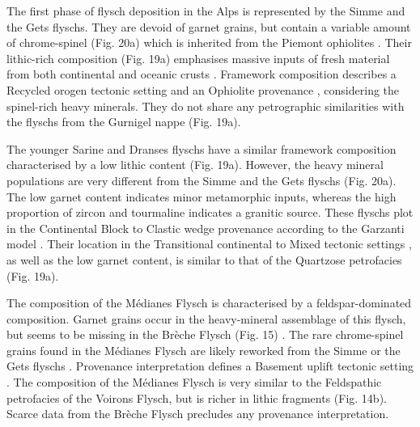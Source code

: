 \documentclass[twoside]{article}
\begin{document}
The first phase of flysch deposition in the Alps is represented by the Simme and the Gets flyschs. They are devoid of garnet grains, but contain a variable amount of chrome-spinel (Fig. 20a) which is inherited from the Piemont ophiolites \citep{Bertrand1976,Bill1997,Beltran-Trivino2013}. Their lithic-rich composition (Fig. 19a) emphasises massive inputs of fresh material from both continental and oceanic crusts \citep[and references therein]{Gasinski1997}. Framework composition describes a Recycled orogen tectonic setting \citep{Dickinson1979a} and an Ophiolite provenance \citep{Garzanti2007b}, considering the spinel-rich heavy minerals. They do not share any petrographic similarities with the flyschs from the Gurnigel nappe (Fig. 19a).\par
\medskip
The younger Sarine and Dranses flyschs have a similar framework composition characterised by a low lithic content (Fig. 19a). However, the heavy mineral populations are very different from the Simme and the Gets flyschs (Fig. 20a). The low garnet content indicates minor metamorphic inputs, whereas the high proportion of zircon and tourmaline indicates a granitic source. These flyschs plot in the Continental Block to Clastic wedge provenance according to the Garzanti model \citep{Garzanti2007b}. Their location in the Transitional continental to Mixed tectonic settings \citep{Dickinson1979a,Dickinson1985}, as well as the low garnet content, is similar to that of the Quartzose petrofacies (Fig. 19a).\par
\medskip
The composition of the Médianes Flysch is characterised by a feldspar-dominated composition. Garnet grains occur in the heavy-mineral assemblage of this flysch, but seems to be missing in the Brèche Flysch (Fig. 15) . The rare chrome-spinel grains found in the Médianes Flysch \citep{Fluck1973} are likely reworked from the Simme or the Gets flyschs \citep{Beltran-Trivino2013}. Provenance interpretation defines a Basement uplift tectonic setting \citep{Dickinson1979a,Dickinson1985}. The composition of the Médianes Flysch is very similar to the Feldspathic petrofacies of the Voirons Flysch, but is richer in lithic fragments (Fig. 14b). Scarce data from the Brèche Flysch precludes any provenance interpretation.\par
\medskip
\end{document}
